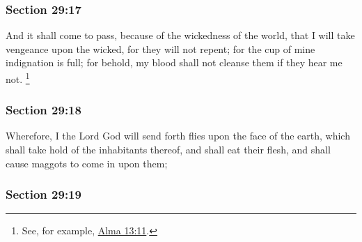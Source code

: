 	\subsubsection{Section 29:17} %
		\label{DC29-17}

		And it shall come to pass, because of the wickedness of the world, that I will take vengeance upon the wicked, for they will not repent; for the cup of mine indignation is full; for behold, my blood shall not cleanse them if they hear me not.%
			\footnote{%
				See, for example, \hyperref[ALMA-13-11]{Alma 13:11}.
				}


	\subsubsection{Section 29:18} %
		\label{DC29-18}

		Wherefore, I the Lord God will send forth flies upon the face of the earth, which shall take hold of the inhabitants thereof, and shall eat their flesh, and shall cause maggots to come in upon them;


	\subsubsection{Section 29:19} %
		\label{DC29-19}

